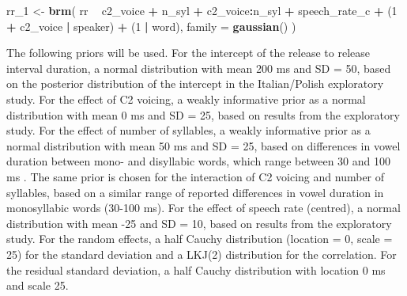 \documentclass[11pt,]{article}
\newenvironment{Shaded}{\begin{snugshade}}{\end{snugshade}}
\newcommand{\DataTypeTok}[1]{\textcolor[rgb]{0.13,0.29,0.53}{#1}}
\newcommand{\DecValTok}[1]{\textcolor[rgb]{0.00,0.00,0.81}{#1}}
\newcommand{\KeywordTok}[1]{\textcolor[rgb]{0.13,0.29,0.53}{\textbf{#1}}}
\newcommand{\NormalTok}[1]{#1}
\newcommand{\OperatorTok}[1]{\textcolor[rgb]{0.81,0.36,0.00}{\textbf{#1}}}
\newcommand{\StringTok}[1]{\textcolor[rgb]{0.31,0.60,0.02}{#1}}
\begin{document}
\begin{Shaded}
\begin{Highlighting}[]
\NormalTok{rr_}\DecValTok{1}\NormalTok{ <-}\StringTok{ }\KeywordTok{brm}\NormalTok{(}
\NormalTok{  rr }\OperatorTok{~}
\StringTok{    }\NormalTok{c2_voice }\OperatorTok{+}
\StringTok{    }\NormalTok{n_syl }\OperatorTok{+}
\StringTok{    }\NormalTok{c2_voice}\OperatorTok{:}\NormalTok{n_syl }\OperatorTok{+}
\StringTok{    }\NormalTok{speech_rate_c }\OperatorTok{+}
\StringTok{    }\NormalTok{(}\DecValTok{1} \OperatorTok{+}\StringTok{ }\NormalTok{c2_voice }\OperatorTok{|}\StringTok{ }\NormalTok{speaker) }\OperatorTok{+}
\StringTok{    }\NormalTok{(}\DecValTok{1} \OperatorTok{|}\StringTok{ }\NormalTok{word),}
  \DataTypeTok{family =} \KeywordTok{gaussian}\NormalTok{()}
\NormalTok{)}
\end{Highlighting}
\end{Shaded}

The following priors will be used. For the intercept of the release to
release interval duration, a normal distribution with mean 200 ms and SD
= 50, based on the posterior distribution of the intercept in the
Italian/Polish exploratory study. For the effect of C2 voicing, a weakly
informative prior as a normal distribution with mean 0 ms and SD = 25,
based on results from the exploratory study. For the effect of number of
syllables, a weakly informative prior as a normal distribution with mean
50 ms and SD = 25, based on differences in vowel duration between mono-
and disyllabic words, which range between 30 and 100 ms
\citep{sharf1962, klatt1973}. The same prior is chosen for the
interaction of C2 voicing and number of syllables, based on a similar
range of reported differences in vowel duration in monosyllabic words
(30-100 ms). For the effect of speech rate (centred), a normal
distribution with mean -25 and SD = 10, based on results from the
exploratory study. For the random effects, a half Cauchy distribution
(location = 0, scale = 25) for the standard deviation and a LKJ(2)
distribution for the correlation. For the residual standard deviation, a
half Cauchy distribution with location 0 ms and scale 25.
\end{document}
